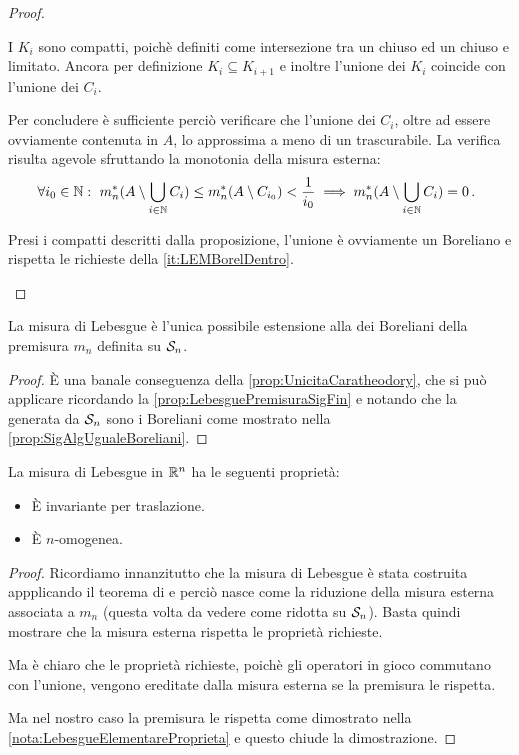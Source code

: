 \begin{proof}
\begin{description}
		I $K_i$ sono compatti, poichè definiti come intersezione tra un chiuso ed un chiuso e limitato. 
		Ancora per definizione $K_i\subseteq K_{i+1}$ e inoltre l'unione dei $K_i$ coincide con l'unione dei $C_i$.
		
		Per concludere è sufficiente perciò verificare che l'unione dei $C_i$, oltre ad essere ovviamente contenuta in $A$, lo approssima a meno di un trascurabile.
		La verifica risulta agevole sfruttando la monotonia della misura esterna:
		\begin{equation*}
			\forall i_0\in\N:\ m_n^*(A\setminus \bigcup_{i\in\N} C_i)\le m_n^*(A\setminus C_{i_0})< \frac 1{i_0}\implies m_n^*(A\setminus \bigcup_{i\in\N} C_i)=0 \punto
		\end{equation*}

		\item[\ImplicationProof{it:LEMCompattiDentro}{it:LEMBorelDentro}] Presi i compatti descritti dalla proposizione, l'unione è ovviamente un Boreliano e rispetta le richieste della \ref{it:LEMBorelDentro}.
	\end{description}

\end{proof}

\begin{proposition}\label{prop:LebesgueUnicaEstensione}
	La misura di Lebesgue è l'unica possibile estensione alla \sigalg{} dei Boreliani della premisura $m_n$ definita su $\S_n$.
\end{proposition}
\begin{proof}
	È una banale conseguenza della \cref{prop:UnicitaCaratheodory}, che si può applicare ricordando la \cref{prop:LebesguePremisuraSigFin} e notando che la \sigalg{} generata da $\S_n$ sono i Boreliani come mostrato nella \cref{prop:SigAlgUgualeBoreliani}.
\end{proof}

\begin{remark}\label{nota:LebesgueProprieta}
	La misura di Lebesgue in $\R^n$ ha le seguenti proprietà:
	\begin{itemize}
		\item È invariante per traslazione.
		\item È $n$-omogenea.
	\end{itemize}
\end{remark}
\begin{proof}
	Ricordiamo innanzitutto che la misura di Lebesgue è stata costruita appplicando il teorema di \carat{} e perciò nasce come la riduzione della misura esterna associata a $m_n$ (questa volta da vedere come ridotta su $\S_n$). 
	Basta quindi mostrare che la misura esterna rispetta le proprietà richieste.
	
	Ma è chiaro che le proprietà richieste, poichè gli operatori in gioco commutano con l'unione, vengono ereditate dalla misura esterna se la premisura le rispetta.
	
	Ma nel nostro caso la premisura le rispetta come dimostrato nella \cref{nota:LebesgueElementareProprieta} e questo chiude la dimostrazione.
\end{proof}

